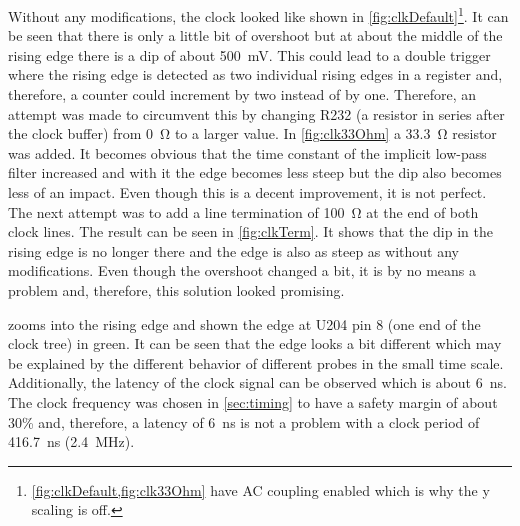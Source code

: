 Without any modifications, the clock looked like shown in \cref{fig:clkDefault}\footnote{\cref{fig:clkDefault,fig:clk33Ohm} have AC coupling enabled which is why the y scaling is off.}.
It can be seen that there is only a little bit of overshoot but at about the middle of the rising edge there is a dip of about \qty{500}{\milli\volt}.
This could lead to a double trigger where the rising edge is detected as two individual rising edges in a register and, therefore, a counter could increment by two instead of by one.
Therefore, an attempt was made to circumvent this by changing R232 (a resistor in series after the clock buffer) from \qty{0}{\ohm} to a larger value.
In \cref{fig:clk33Ohm} a \qty{33.3}{\ohm} resistor was added.
It becomes obvious that the time constant of the implicit low-pass filter increased and with it the edge becomes less steep but the dip also becomes less of an impact.
Even though this is a decent improvement, it is not perfect.
The next attempt was to add a line termination of \qty{100}{\ohm} at the end of both clock lines.
The result can be seen in \cref{fig:clkTerm}.
It shows that the dip in the rising edge is no longer there and the edge is also as steep as without any modifications.
Even though the overshoot changed a bit, it is by no means a problem and, therefore, this solution looked promising.

 zooms into the rising edge and shown the edge at U204 pin 8 (one end of the clock tree) in green.
It can be seen that the edge looks a bit different which may be explained by the different behavior of different probes in the small time scale.
Additionally, the latency of the clock signal can be observed which is about \qty{6}{\nano\second}.
The clock frequency was chosen in \cref{sec:timing} to have a safety margin of about 30\% and, therefore, a latency of \qty{6}{\nano\second} is not a problem with a clock period of \qty{416.7}{\nano\second} (\qty{2.4}{\mega\hertz}).

